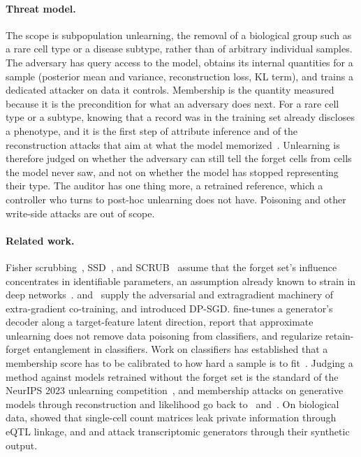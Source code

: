 \documentclass{article}
\begin{document}
\paragraph{Threat model.} The scope is subpopulation unlearning, the removal of a biological group such as a rare cell type or a disease subtype, rather than of arbitrary individual samples. The adversary has query access to the model, obtains its internal quantities for a sample (posterior mean and variance, reconstruction loss, KL term), and trains a dedicated attacker on data it controls. Membership is the quantity measured because it is the precondition for what an adversary does next. For a rare cell type or a subtype, knowing that a record was in the training set already discloses a phenotype, and it is the first step of attribute inference and of the reconstruction attacks that aim at what the model memorized~\citep{yeom2018, carlini2022, hilprecht2019, chen2020}. Unlearning is therefore judged on whether the adversary can still tell the forget cells from cells the model never saw, and not on whether the model has stopped representing their type. The auditor has one thing more, a retrained reference, which a controller who turns to post-hoc unlearning does not have. Poisoning and other write-side attacks are out of scope.

\paragraph{Related work.} Fisher scrubbing~\citep{golatkar2020}, SSD~\citep{foster2024}, and SCRUB~\citep{kurmanji2023} assume that the forget set's influence concentrates in identifiable parameters, an assumption already known to strain in deep networks~\citep{basu2021}. \citet{nasr2018} and~\citet{chavdarova2019} supply the adversarial and extragradient machinery of extra-gradient co-training, and \citet{abadi2016} introduced DP-SGD. \citet{moon2024} fine-tunes a generator's decoder along a target-feature latent direction, \citet{pawelczyk2025} report that approximate unlearning does not remove data poisoning from classifiers, and \citet{cheng2026} regularize retain-forget entanglement in classifiers. Work on classifiers has established that a membership score has to be calibrated to how hard a sample is to fit~\citep{watson2022, jayaraman2021, rezaei2021, carlini2022}. Judging a method against models retrained without the forget set is the standard of the NeurIPS 2023 unlearning competition~\citep{triantafillou2024}, and membership attacks on generative models through reconstruction and likelihood go back to~\citet{hilprecht2019} and~\citet{chen2020}. On biological data, \citet{walker2024} showed that single-cell count matrices leak private information through eQTL linkage, and \citet{golob2026} and \citet{ozturk2026} attack transcriptomic generators through their synthetic output.
\end{document}
